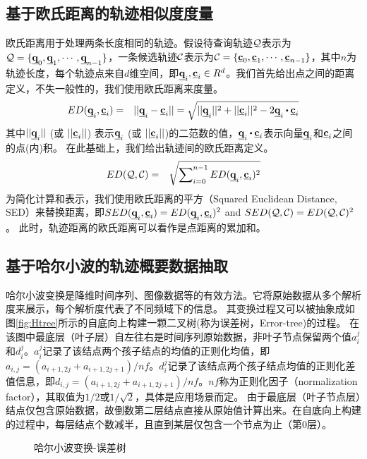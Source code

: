 \subsection{基于欧氏距离的轨迹相似度度量}\label{sec-c4-ED}
欧氏距离用于处理两条长度相同的轨迹。假设待查询轨迹$\cal Q$表示为${\cal Q}=\{\emph{{\textbf{q}}}_{0}, \emph{{\textbf{q}}}_{1}, \cdots, \emph{{\textbf{q}}}_{n-1}\}$，一条候选轨迹$\cal C$表示为${\cal C}=\{\emph{{\textbf{c}}}_{0}, \emph{{\textbf{c}}}_{1}, \cdots, \emph{{\textbf{c}}}_{n-1}\}$，其中$n$为轨迹长度，每个轨迹点来自$d$维空间，即$\emph{{\textbf{q}}}_{i},\emph{{\textbf{c}}}_{i} \in R^{d}$。我们首先给出点之间的距离定义，不失一般性的，我们使用欧氏距离来度量。
\begin{eqnarray}
ED(\vq_{i}, \vc_{i}) & = & ||\vq_i-\vc_i|| =\sqrt{||\vq_{i}||^2+||\vc_{i}||^2- 2 \vq_{i}\bigcdot \vc_{i}}
\end{eqnarray}
其中$||\emph{{\textbf{q}}}_i||$ (或 $||\emph{{\textbf{c}}}_i||$) 表示$\emph{{\textbf{q}}}_i$ (或 $||\emph{{\textbf{c}}}_i||$)的二范数的值，$\vq_{i}\bigcdot \vc_{i}$表示向量$\emph{{\textbf{q}}}_{i}$和$\emph{{\textbf{c}}}_{i}$之间的点(内)积。
在此基础上，我们给出轨迹间的欧氏距离定义。
\begin{eqnarray}
ED({\cal Q}, {\cal C}) & = & \sqrt{ \sum\nolimits_{i=0}^{n-1}ED(\emph{{\textbf{q}}}_{i},\emph{{\textbf{c}}}_{i})^{2}}
\end{eqnarray}
为简化计算和表示，我们使用欧氏距离的平方（Squared Euclidean Distance, SED）来替换距离，即$SED(\emph{{\textbf{q}}}_{i}, \emph{{\textbf{c}}}_{i})=ED(\emph{{\textbf{q}}}_{i}, \emph{{\textbf{c}}}_{i})^2$ and $SED({\cal Q}, {\cal C})= ED({\cal Q}, {\cal C})^2$。
此时，轨迹距离的欧氏距离可以看作是点距离的累加和。

\subsection{基于哈尔小波的轨迹概要数据抽取}\label{sec-c4-HaarWavelet}
哈尔小波变换是降维时间序列、图像数据等的有效方法。它将原始数据从多个解析度来展示，每个解析度代表了不同频域下的信息。
其变换过程又可以被抽象成如图\ref{fig:Htree}所示的自底向上构建一颗二叉树(称为误差树，Error-tree)的过程。
在该图中最底层（叶子层）自左往右是时间序列原始数据，非叶子节点保留两个值$a_{i}^{j}$和$d_{i}^{j}$。$a_{i}^{j}$记录了该结点两个孩子结点的均值的正则化均值，即$a_{i,j}=({a_{i+1,2j}+a_{i+1,2j+1}})/{nf}$。$d_{i}^{j}$记录了该结点两个孩子结点均值的正则化差值信息，即$d_{i,j}=({a_{i+1,2j}+a_{i+1,2j+1}})/{nf}$。$nf$称为正则化因子（normalization factor），其取值为$1/2$或$1/\sqrt{2}$，具体是应用场景而定。
由于最底层（叶子节点层）结点仅包含原始数据，故倒数第二层结点直接从原始值计算出来。在自底向上构建的过程中，每层结点个数减半，且直到某层仅包含一个节点为止（第0层）。

\begin{figure}[t]
	\centering
	\vspace{-10pt}
	\caption{哈尔小波变换-误差树}
	\label{fig:HaarTree}
	\vspace{-10pt}
\end{figure}


